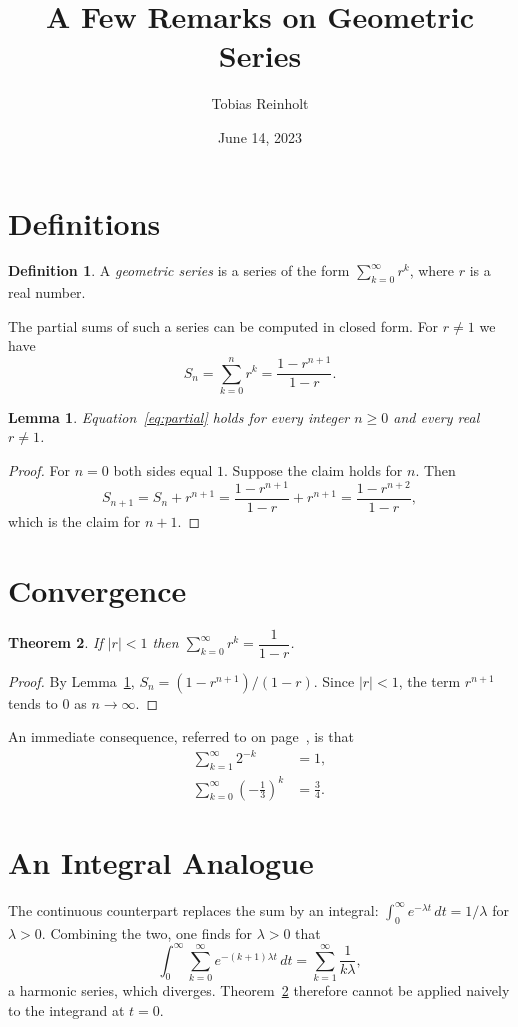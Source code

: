 \documentclass[12pt,a4paper]{article}
\title{A Few Remarks on Geometric Series}
\author{Tobias Reinholt}
\date{June 14, 2023}
\newtheorem{theorem}{Theorem}
\newtheorem{lemma}[theorem]{Lemma}
\theoremstyle{definition}
\newtheorem{definition}{Definition}
\begin{document}
\maketitle

\section{Definitions}
\begin{definition}\label{def:geo}
A \emph{geometric series} is a series of the form $\sum_{k=0}^{\infty} r^k$,
where $r$ is a real number.
\end{definition}

The partial sums of such a series can be computed in closed form. For
$r \neq 1$ we have
\begin{equation}\label{eq:partial}
S_n = \sum_{k=0}^{n} r^k = \frac{1 - r^{n+1}}{1 - r}.
\end{equation}

\begin{lemma}\label{lem:partial}
Equation~\eqref{eq:partial} holds for every integer $n \geq 0$ and every
real $r \neq 1$.
\end{lemma}
\begin{proof}
For $n = 0$ both sides equal $1$. Suppose the claim holds for $n$. Then
\[
S_{n+1} = S_n + r^{n+1} = \frac{1 - r^{n+1}}{1 - r} + r^{n+1}
        = \frac{1 - r^{n+2}}{1 - r},
\]
which is the claim for $n+1$.
\end{proof}

\section{Convergence}
\begin{theorem}\label{thm:conv}
If $|r| < 1$ then $\sum_{k=0}^{\infty} r^k = \dfrac{1}{1-r}$.
\end{theorem}
\begin{proof}
By Lemma~\ref{lem:partial}, $S_n = (1 - r^{n+1})/(1-r)$. Since $|r|<1$, the
term $r^{n+1}$ tends to $0$ as $n \to \infty$.
\end{proof}

An immediate consequence, referred to on page~\pageref{thm:conv}, is that
\begin{align}
\sum_{k=1}^{\infty} 2^{-k} &= 1, \\
\sum_{k=0}^{\infty} \left(-\tfrac{1}{3}\right)^k &= \tfrac{3}{4}.
\end{align}

\section*{An Integral Analogue}
The continuous counterpart replaces the sum by an integral:
$\int_0^\infty e^{-\lambda t}\,dt = 1/\lambda$ for $\lambda > 0$. Combining
the two, one finds for $\lambda > 0$ that
\[
\int_0^{\infty} \sum_{k=0}^{\infty} e^{-(k+1)\lambda t}\,dt
  = \sum_{k=1}^{\infty} \frac{1}{k\lambda},
\]
a harmonic series, which diverges. Theorem~\ref{thm:conv} therefore cannot be
applied naively to the integrand at $t = 0$.
\end{document}
